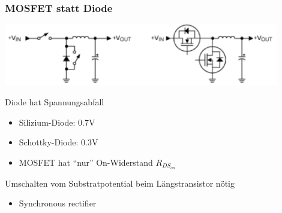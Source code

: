 	\subsubsection{MOSFET statt Diode}
		\includegraphics[width=12cm]{images/effizient1}
		\begin{itemize}
		\begin{minipage}{8cm}
 		 	\item Diode hat Spannungsabfall
  			\begin{itemize}
    			\item Silizium-Diode: 0.7V
   				\item Schottky-Diode: 0.3V
    			\item MOSFET hat "`nur"' On-Widerstand $R_{DS_{on}}$
			\end{itemize}
		\end{minipage}
		\begin{minipage}{8cm}
			\item Umschalten vom Substratpotential beim Längstransistor nötig
   			\begin{itemize}
     			\item Synchronous rectifier
    		\end{itemize}
		\end{minipage}
		\end{itemize}